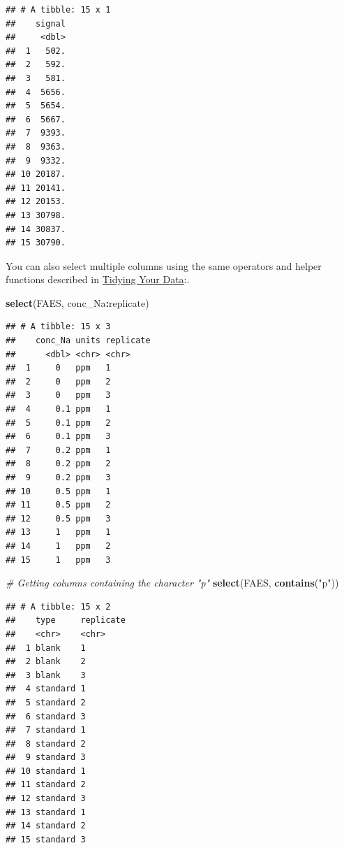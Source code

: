 \documentclass[
]{book}
\newenvironment{Shaded}{\begin{snugshade}}{\end{snugshade}}
\newcommand{\CommentTok}[1]{\textcolor[rgb]{0.56,0.35,0.01}{\textit{#1}}}
\newcommand{\FunctionTok}[1]{\textcolor[rgb]{0.13,0.29,0.53}{\textbf{#1}}}
\newcommand{\NormalTok}[1]{#1}
\newcommand{\SpecialCharTok}[1]{\textcolor[rgb]{0.81,0.36,0.00}{\textbf{#1}}}
\newcommand{\StringTok}[1]{\textcolor[rgb]{0.31,0.60,0.02}{#1}}
\begin{document}
\begin{verbatim}
## # A tibble: 15 x 1
##    signal
##     <dbl>
##  1   502.
##  2   592.
##  3   581.
##  4  5656.
##  5  5654.
##  6  5667.
##  7  9393.
##  8  9363.
##  9  9332.
## 10 20187.
## 11 20141.
## 12 20153.
## 13 30798.
## 14 30837.
## 15 30790.
\end{verbatim}

You can also select multiple columns using the same operators and helper functions described in \protect\hyperlink{tidying-your-data}{Tidying Your Data}:.

\begin{Shaded}
\begin{Highlighting}[]
\FunctionTok{select}\NormalTok{(FAES, conc\_Na}\SpecialCharTok{:}\NormalTok{replicate)}
\end{Highlighting}
\end{Shaded}

\begin{verbatim}
## # A tibble: 15 x 3
##    conc_Na units replicate
##      <dbl> <chr> <chr>    
##  1     0   ppm   1        
##  2     0   ppm   2        
##  3     0   ppm   3        
##  4     0.1 ppm   1        
##  5     0.1 ppm   2        
##  6     0.1 ppm   3        
##  7     0.2 ppm   1        
##  8     0.2 ppm   2        
##  9     0.2 ppm   3        
## 10     0.5 ppm   1        
## 11     0.5 ppm   2        
## 12     0.5 ppm   3        
## 13     1   ppm   1        
## 14     1   ppm   2        
## 15     1   ppm   3
\end{verbatim}

\begin{Shaded}
\begin{Highlighting}[]
\CommentTok{\# Getting columns containing the character "p"}
\FunctionTok{select}\NormalTok{(FAES, }\FunctionTok{contains}\NormalTok{(}\StringTok{"p"}\NormalTok{))}
\end{Highlighting}
\end{Shaded}

\begin{verbatim}
## # A tibble: 15 x 2
##    type     replicate
##    <chr>    <chr>    
##  1 blank    1        
##  2 blank    2        
##  3 blank    3        
##  4 standard 1        
##  5 standard 2        
##  6 standard 3        
##  7 standard 1        
##  8 standard 2        
##  9 standard 3        
## 10 standard 1        
## 11 standard 2        
## 12 standard 3        
## 13 standard 1        
## 14 standard 2        
## 15 standard 3
\end{verbatim}
\end{document}
